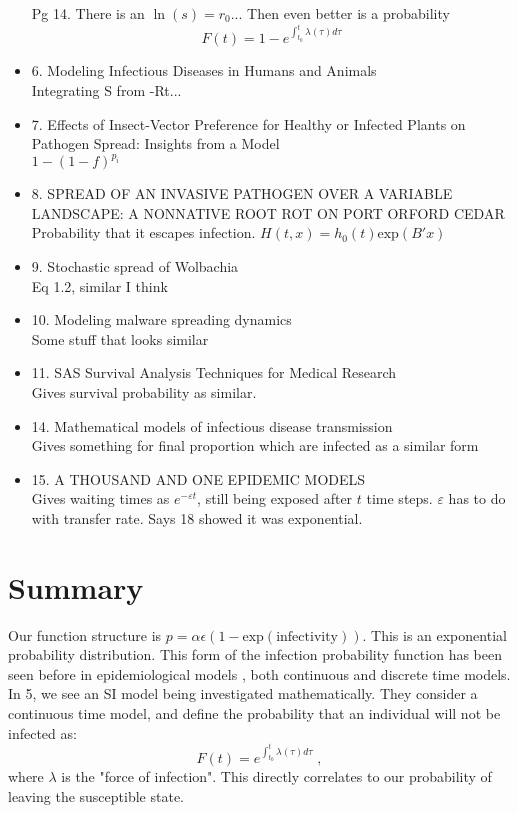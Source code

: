 \documentclass[11pt]{article}
\theoremstyle{definition}
\begin{document}
\begin{itemize}
Pg 14. There is an $\ln(s) = r_0...$
Then even better is a probability 
$$F (t) = 1-e^{\int_{t_0}^t \lambda(\tau) d\tau}$$
\item 6. Modeling Infectious Diseases in Humans and Animals\\
Integrating S from -Rt...
\item 7. Effects of Insect-Vector Preference for Healthy or Infected Plants on Pathogen Spread: Insights from a Model\\
$1-(1-f)^{p_i}$
\item 8. SPREAD OF AN INVASIVE PATHOGEN OVER A VARIABLE LANDSCAPE: A NONNATIVE ROOT ROT ON PORT ORFORD CEDAR\\
Probability that it escapes infection. $H(t,x) = h_0(t)\text{exp}(B'x)$
\item 9. Stochastic spread of Wolbachia\\
Eq 1.2, similar I think
\item 10. Modeling malware spreading dynamics\\
Some stuff that looks similar
\item 11. SAS Survival Analysis Techniques for Medical Research\\
Gives survival probability as similar.
\item 14. Mathematical models of infectious disease transmission\\
Gives something for final proportion which are infected as a similar form
\item 15. A THOUSAND AND ONE EPIDEMIC MODELS\\
Gives waiting times as $e^{-\varepsilon t}$, still being exposed after $t$ time steps. $\varepsilon$ has to do with transfer rate. Says 18 showed it was exponential.
\end{itemize}

\section{Summary}
Our function structure is $p=\alpha \epsilon (1-\text{exp}(\text{infectivity}))$. This is an exponential probability distribution. This form of the infection probability function has been seen before in epidemiological models \cite{5,11,14,15}, both continuous and discrete time models. In 5, we see an SI model being investigated mathematically. They consider a continuous time model, and define the probability that an individual will not be infected as:
$$F (t) = e^{\int_{t_0}^t \lambda(\tau) d\tau}\;,$$
where $\lambda$ is the "force of infection". This directly correlates to our probability of leaving the susceptible state. \par
\end{document}
